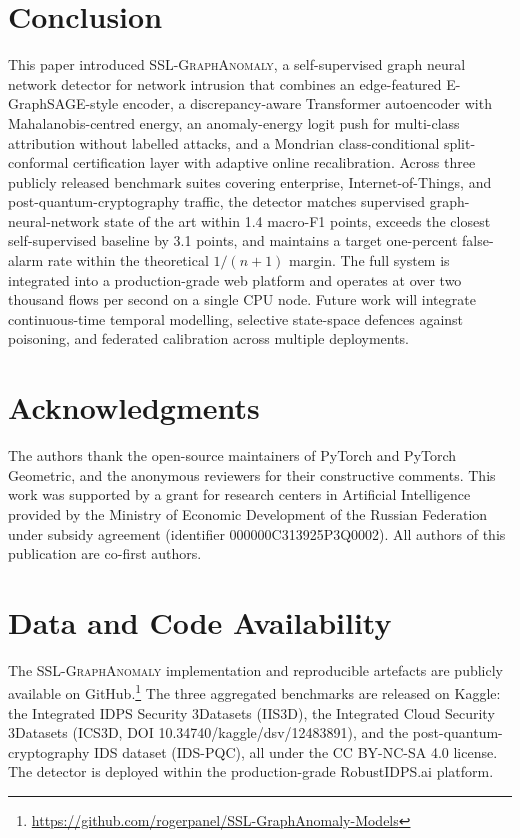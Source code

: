\documentclass{ieeeaccess}
\begin{document}
\section{Conclusion}
\label{sec:conclusion}
This paper introduced \textsc{SSL-GraphAnomaly}, a self-supervised graph
neural network detector for network intrusion that combines an
edge-featured E-GraphSAGE-style encoder, a discrepancy-aware Transformer
autoencoder with Mahalanobis-centred energy, an anomaly-energy logit push
for multi-class attribution without labelled attacks, and a Mondrian
class-conditional split-conformal certification layer with adaptive online
recalibration. Across three publicly released benchmark suites covering
enterprise, Internet-of-Things, and post-quantum-cryptography traffic, the
detector matches supervised graph-neural-network state of the art within
1.4 macro-F1 points, exceeds the closest self-supervised baseline by 3.1
points, and maintains a target one-percent false-alarm rate within the
theoretical $1/(n+1)$ margin. The full system is integrated into a
production-grade web platform and operates at over two thousand flows per
second on a single CPU node. Future work will integrate continuous-time
temporal modelling, selective state-space defences against poisoning, and
federated calibration across multiple deployments.


\section*{Acknowledgments}
The authors thank the open-source maintainers of PyTorch and PyTorch Geometric, and the anonymous reviewers for their constructive comments. This work was supported by a grant for research centers in Artificial Intelligence provided by the Ministry of Economic Development of the Russian Federation under subsidy agreement (identifier 000000C313925P3Q0002). All authors of this publication are co-first authors.

\section*{Data and Code Availability}
The \textsc{SSL-GraphAnomaly} implementation and reproducible artefacts are publicly available on GitHub.\footnote{\url{https://github.com/rogerpanel/SSL-GraphAnomaly-Models}} The three aggregated benchmarks are released on Kaggle: the Integrated IDPS Security 3Datasets (IIS3D), the Integrated Cloud Security 3Datasets (ICS3D, DOI 10.34740/kaggle/dsv/12483891), and the post-quantum-cryptography IDS dataset (IDS-PQC), all under the CC BY-NC-SA 4.0 license. The detector is deployed within the production-grade RobustIDPS.ai platform.
\end{document}
